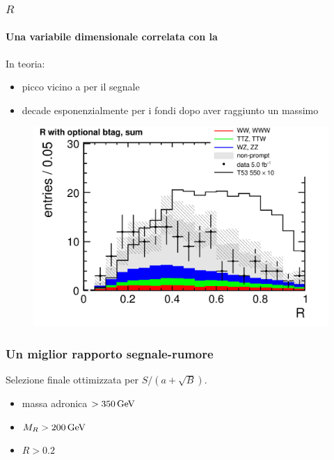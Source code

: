 \documentclass[italian]{beamer}
\begin{document}
\begin{frame}
    \frametitle{$R$}
    \framesubtitle{Una variabile dimensionale correlata con la \met}
    In teoria:
    \begin{itemize}
        \item picco vicino a  per il segnale
        \item decade esponenzialmente per i fondi dopo aver raggiunto un
            massimo
    \end{itemize}
        \begin{figure}[h]
            \centering
            \includegraphics[width=.7\textwidth]{r_optional_btag_sum}
        \end{figure}
\end{frame}

\begin{frame}
    \frametitle{Un miglior rapporto segnale-rumore}
    Selezione finale ottimizzata per $S/(a + \sqrt{B})$. 
    \begin{itemize}
        \item massa adronica $>\unit[350]{GeV}$
        \item $M_R > \unit[200]{GeV}$
        \item $R > 0.2$
    \end{itemize}
\end{frame}
\end{document}
